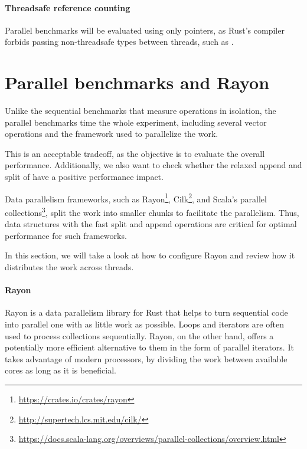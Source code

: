 \paragraph{Threadsafe reference counting}
Parallel benchmarks will be evaluated using only \arc{} pointers, as Rust's compiler forbids passing non-threadsafe types between threads, such as \rc{}.

\section{Parallel benchmarks and Rayon}
Unlike the sequential benchmarks that measure operations in isolation, the parallel benchmarks time the whole experiment, including several vector operations and the framework used to parallelize the work.

This is an acceptable tradeoff, as the objective is to evaluate the overall performance. Additionally, we also want to check whether the relaxed append and split of \rrbvec{} have a positive performance impact.

Data parallelism frameworks, such as Rayon\footnote{\url{https://crates.io/crates/rayon}}, Cilk\footnote{\url{http://supertech.lcs.mit.edu/cilk/}}, and Scala's parallel collections\footnote{\url{https://docs.scala-lang.org/overviews/parallel-collections/overview.html}}, split the work into smaller chunks to facilitate the parallelism. Thus, data structures with the fast split and append operations are critical for optimal performance for such frameworks.

In this section, we will take a look at how to configure Rayon and review how it distributes the work across threads.

\paragraph{Rayon}
Rayon is a data parallelism library for Rust that helps to turn sequential code into parallel one with as little work as possible. Loops and iterators are often used to process collections sequentially. Rayon, on the other hand, offers a potentially more efficient alternative to them in the form of parallel iterators. It takes advantage of modern processors, by dividing the work between available cores as long as it is beneficial.

